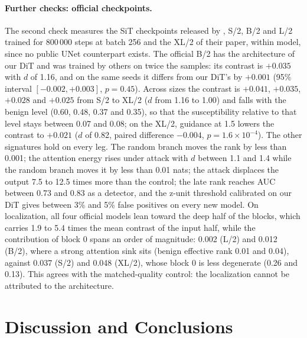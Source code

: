 \documentclass{article}
\begin{document}
\paragraph{Further checks: official checkpoints.} The second check measures the SiT checkpoints released by \citet{ma2024sit}, S/2, B/2 and L/2 trained for 800\,000 steps at batch 256 and the XL/2 of their paper, within model, since no public UNet counterpart exists. The official B/2 has the architecture of our DiT and was trained by others on twice the samples: its contrast is $+0.035$ with $d$ of 1.16, and on the same seeds it differs from our DiT's by $+0.001$ (95\% interval $[-0.002, +0.003]$, $p = 0.45$). Across sizes the contrast is $+0.041$, $+0.035$, $+0.028$ and $+0.025$ from S/2 to XL/2 ($d$ from 1.16 to 1.00) and falls with the benign level (0.60, 0.48, 0.37 and 0.35), so that the susceptibility relative to that level stays between 0.07 and 0.08; on the XL/2, guidance at 1.5 lowers the contrast to $+0.021$ ($d$ of 0.82, paired difference $-0.004$, $p = 1.6{\times}10^{-4}$). The other signatures hold on every leg. The random branch moves the rank by less than 0.001; the attention energy rises under attack with $d$ between 1.1 and 1.4 while the random branch moves it by less than 0.01 nats; the attack displaces the output 7.5 to 12.5 times more than the control; the late rank reaches AUC between 0.73 and 0.83 as a detector, and the z-unit threshold calibrated on our DiT gives between 3\% and 5\% false positives on every new model. On localization, all four official models lean toward the deep half of the blocks, which carries 1.9 to 5.4 times the mean contrast of the input half, while the contribution of block 0 spans an order of magnitude: 0.002 (L/2) and 0.012 (B/2), where a strong attention sink sits (benign effective rank 0.01 and 0.04), against 0.037 (S/2) and 0.048 (XL/2), whose block 0 is less degenerate (0.26 and 0.13). This agrees with the matched-quality control: the localization cannot be attributed to the architecture.

\section{Discussion and Conclusions}\label{sec:discussion}
\end{document}
